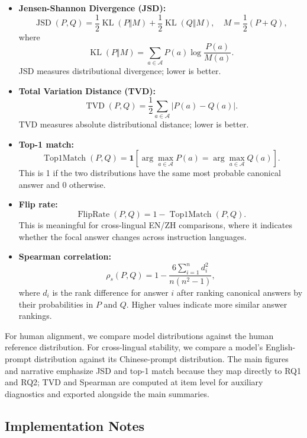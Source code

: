 \documentclass[11pt]{article}
\begin{document}
\begin{itemize}[leftmargin=*]
  \item \textbf{Jensen-Shannon Divergence (JSD):}
  \[
    \operatorname{JSD}(P,Q)
    = \frac{1}{2}\operatorname{KL}(P \Vert M)
    + \frac{1}{2}\operatorname{KL}(Q \Vert M),
    \quad
    M = \frac{1}{2}(P+Q),
  \]
  where
  \[
    \operatorname{KL}(P \Vert M)
    = \sum_{a \in \mathcal{A}} P(a)\log \frac{P(a)}{M(a)}.
  \]
  JSD measures distributional divergence; lower is better.

  \item \textbf{Total Variation Distance (TVD):}
  \[
    \operatorname{TVD}(P,Q)
    = \frac{1}{2}\sum_{a \in \mathcal{A}} |P(a)-Q(a)|.
  \]
  TVD measures absolute distributional distance; lower is better.

  \item \textbf{Top-1 match:}
  \[
    \operatorname{Top1Match}(P,Q)
    =
    \mathbf{1}\left[
      \arg\max_{a \in \mathcal{A}} P(a)
      =
      \arg\max_{a \in \mathcal{A}} Q(a)
    \right].
  \]
  This is 1 if the two distributions have the same most probable canonical answer and 0 otherwise.

  \item \textbf{Flip rate:}
  \[
    \operatorname{FlipRate}(P,Q)
    = 1 - \operatorname{Top1Match}(P,Q).
  \]
  This is meaningful for cross-lingual EN/ZH comparisons, where it indicates whether the focal answer changes across instruction languages.

  \item \textbf{Spearman correlation:}
  \[
    \rho_s(P,Q)
    =
    1 - \frac{6\sum_{i=1}^{n} d_i^2}{n(n^2-1)},
  \]
  where $d_i$ is the rank difference for answer $i$ after ranking canonical answers by their probabilities in $P$ and $Q$. Higher values indicate more similar answer rankings.
\end{itemize}

For human alignment, we compare model distributions against the human reference distribution. For cross-lingual stability, we compare a model's English-prompt distribution against its Chinese-prompt distribution. The main figures and narrative emphasize JSD and top-1 match because they map directly to RQ1 and RQ2; TVD and Spearman are computed at item level for auxiliary diagnostics and exported alongside the main summaries.

\subsection{Implementation Notes}
\end{document}

